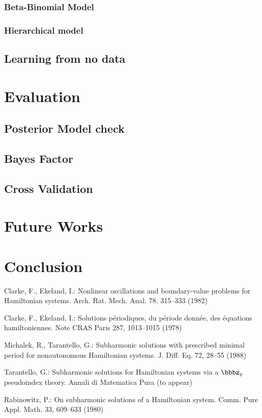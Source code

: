 \documentclass{llncs}
\begin{document}
\subsubsection{Beta-Binomial Model}
\subsubsection{Hierarchical model}
\subsection{Learning from no data}
\subsubsection{}
%
\section{Evaluation}
\subsection{Posterior Model check}
\subsection{Bayes Factor}
\subsection{Cross Validation}

\section{Future Works}

\section{Conclusion}
%
\begin{thebibliography}{5}
%
Clarke, F., Ekeland, I.:
Nonlinear oscillations and
boundary-value problems for Hamiltonian systems.
Arch. Rat. Mech. Anal. 78, 315--333 (1982)

Clarke, F., Ekeland, I.:
Solutions p\'{e}riodiques, du
p\'{e}riode donn\'{e}e, des \'{e}quations hamiltoniennes.
Note CRAS Paris 287, 1013--1015 (1978)

Michalek, R., Tarantello, G.:
Subharmonic solutions with prescribed minimal
period for nonautonomous Hamiltonian systems.
J. Diff. Eq. 72, 28--55 (1988)

Tarantello, G.:
Subharmonic solutions for Hamiltonian
systems via a $\bbbz_{p}$ pseudoindex theory.
Annali di Matematica Pura (to appear)

Rabinowitz, P.:
On subharmonic solutions of a Hamiltonian system.
Comm. Pure Appl. Math. 33, 609--633 (1980)

\end{thebibliography}
\end{document}

